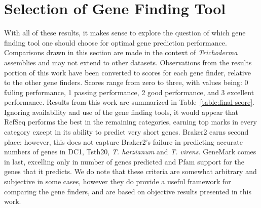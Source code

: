 \section{Selection of Gene Finding Tool}\label{chapter:conclusion}

With all of these results, it makes sense to explore the question of
which gene finding tool one should choose for optimal gene prediction
performance. Comparisons drawn in this section are made in the context
of \textit{Trichoderma} assemblies and may not extend to other
datasets. Observations from the results portion of this work have been
converted to scores for each gene finder, relative to the other gene finders. Scores range
from zero to three, with values being: 0 \- failing performance, 1 \-
passing performance, 2 \- good performance, and 3 \- excellent
performance. Results from this work are summarized in
Table~\ref{table:final-score}. Ignoring availability and use of the
gene finding tools, it would appear that RefSeq performs the best in
the remaining categories, earning top marks in every category except
in its ability to predict very short genes. Braker2 earns second
place; however, this does not capture Braker2's failure in predicting
accurate numbers of genes in DC1, Tsth20, \textit{T. harzianum} and
\textit{T. virens}. GeneMark comes in last, excelling only in number
of genes predicted and Pfam support for the genes that it predicts. We do note that these criteria are somewhat arbitrary and subjective in some cases, however they do provide a useful framework for comparing the gene finders, and are based on objective results presented in this work. 

